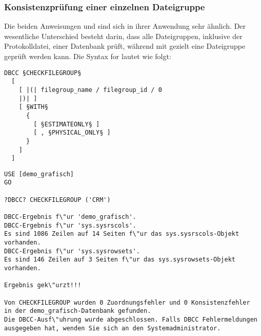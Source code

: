         \subsubsection{Konsistenzprüfung einer einzelnen Dateigruppe}
          Die beiden Anweisungen  und
           sind sich in ihrer Anwendung sehr
          ähnlich. Der wesentliche Unterschied besteht darin, dass
           alle Dateigruppen, inklusive der Protokolldatei,
          einer Datenbank prüft, während mit 
          gezielt eine Dateigruppe geprüft werden kann. Die Syntax for
           lautet wie folgt:
          \begin{lstlisting}[language=ebnf, caption={Die Syntax zu
          CHECKFILEGROUP}, label=admin03_31]
DBCC §CHECKFILEGROUP§
  [
    [ |(| filegroup_name / filegroup_id / 0 
    |)| ]
    [ §WITH§
      {
        [ §ESTIMATEONLY§ ]
        [ , §PHYSICAL_ONLY§ ]
      }
    ]
  ]        
        \end{lstlisting}
        \begin{lstlisting}[language=ms_sql,caption={Konsistenzprüfung
        einer Dateigruppe},label=admin03_32] 
USE [demo_grafisch]
GO

?DBCC? CHECKFILEGROUP ('CRM')

DBCC-Ergebnis f\"ur 'demo_grafisch'.
DBCC-Ergebnis f\"ur 'sys.sysrscols'.
Es sind 1086 Zeilen auf 14 Seiten f\"ur das sys.sysrscols-Objekt vorhanden.
DBCC-Ergebnis f\"ur 'sys.sysrowsets'.
Es sind 146 Zeilen auf 3 Seiten f\"ur das sys.sysrowsets-Objekt vorhanden.

Ergebnis gek\"urzt!!!

Von CHECKFILEGROUP wurden 0 Zuordnungsfehler und 0 Konsistenzfehler
in der demo_grafisch-Datenbank gefunden.
Die DBCC-Ausf\"uhrung wurde abgeschlossen. Falls DBCC Fehlermeldungen 
ausgegeben hat, wenden Sie sich an den Systemadministrator.
        \end{lstlisting}
